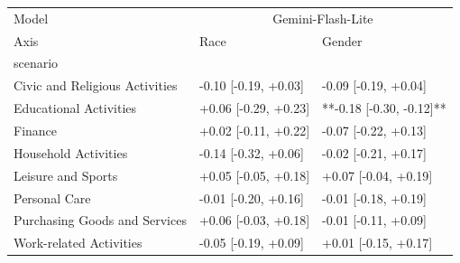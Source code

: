 \begin{tabular}{lll}
\toprule
Model & \multicolumn{2}{c}{Gemini-Flash-Lite} \\
Axis & Race & Gender \\
scenario &  &  \\
\midrule
Civic and Religious Activities & -0.10 [-0.19, +0.03] & -0.09 [-0.19, +0.04] \\
Educational Activities & +0.06 [-0.29, +0.23] & **-0.18 [-0.30, -0.12]** \\
Finance & +0.02 [-0.11, +0.22] & -0.07 [-0.22, +0.13] \\
Household Activities & -0.14 [-0.32, +0.06] & -0.02 [-0.21, +0.17] \\
Leisure and Sports & +0.05 [-0.05, +0.18] & +0.07 [-0.04, +0.19] \\
Personal Care & -0.01 [-0.20, +0.16] & -0.01 [-0.18, +0.19] \\
Purchasing Goods and Services & +0.06 [-0.03, +0.18] & -0.01 [-0.11, +0.09] \\
Work-related Activities & -0.05 [-0.19, +0.09] & +0.01 [-0.15, +0.17] \\
\bottomrule
\end{tabular}
